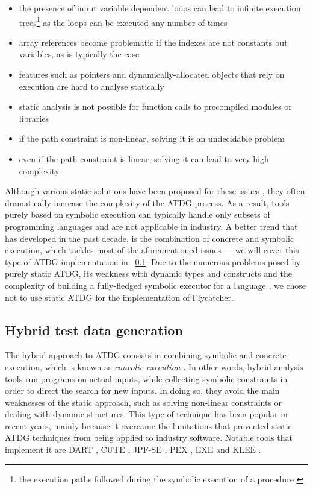 \documentclass[a4paper,11pt,titlepage]{report}
\begin{document}
\begin{itemize}
	\item the presence of input variable dependent loops can lead to infinite execution trees\footnote{the execution paths followed during the symbolic execution of a procedure \cite{king1976symbolic}} as the loops can be executed any number of times
	\item array references become problematic if the indexes are not constants but variables, as is typically the case
	\item features such as pointers and dynamically-allocated objects that rely on execution are hard to analyse statically
	\item static analysis is not possible for function calls to precompiled modules or libraries
	\item if the path constraint is non-linear, solving it is an undecidable problem
	\item even if the path constraint is linear, solving it can lead to very high complexity
\end{itemize}

Although various static solutions have been proposed for these issues \cite{ramamoorthy1976automated,goldberg1994applications,offutt1999dynamic}, they often dramatically increase the complexity of the ATDG process. As a result, tools purely based on symbolic execution can typically handle only subsets of programming languages and are not applicable in industry. A better trend that has developed in the past decade, is the combination of concrete and symbolic execution, which tackles most of the aforementioned issues \cite{păsăreanu2009survey} --- we will cover this type of ATDG implementation in ~\ref{subsec:hybrid_atdg}. Due to the numerous problems posed by purely static ATDG, its weakness with dynamic types and constructs \cite{edvardsson1999survey,tahbildar2automated} and the complexity of building a fully-fledged symbolic executor for a language \cite{edvardsson1999survey,han2008empirical}, we chose not to use static ATDG for the implementation of \textsf{Flycatcher}.

\subsection{Hybrid test data generation}
\label{subsec:hybrid_atdg}

The hybrid approach to ATDG consists in combining symbolic and concrete execution, which is known as \emph{concolic execution} \cite{păsăreanu2009survey}. In other words, hybrid analysis tools run programs on actual inputs, while collecting symbolic constraints in order to direct the search for new inputs. In doing so, they avoid the main weaknesses of the static approach, such as solving non-linear constraints or dealing with dynamic structures. This type of technique has been popular in recent years, mainly because it overcame the limitations that prevented static ATDG techniques from being applied to industry software. Notable tools that implement it are DART \cite{godefroid2005dart}, CUTE \cite{sen2005cute}, JPF-SE \cite{anand2007jpf}, PEX \cite{tillmann2008pex}, EXE \cite{cadar2008exe} and KLEE \cite{cadar2008klee}.
\end{document}
